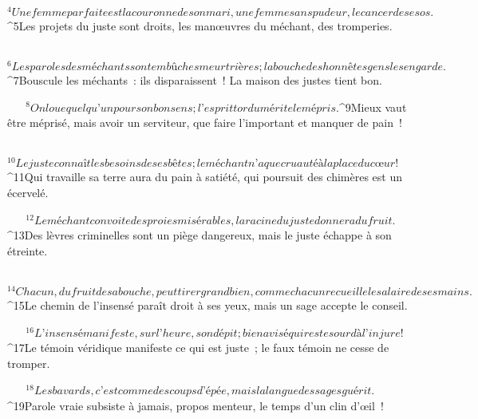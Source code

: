            
         
${}^{4}Une femme parfaite est la couronne de son mari,
        une femme sans pudeur, le cancer de ses os.
        
           
         
${}^{5}Les projets du juste sont droits,
        les manœuvres du méchant, des tromperies.
        
           
         
${}^{6}Les paroles des méchants sont embûches meurtrières ;
        la bouche des honnêtes gens les en garde.
        
           
         
${}^{7}Bouscule les méchants : ils disparaissent !
        La maison des justes tient bon.
        
           
         
${}^{8}On loue quelqu’un pour son bon sens ;
        l’esprit tordu mérite le mépris.
        
           
         
${}^{9}Mieux vaut être méprisé, mais avoir un serviteur,
        que faire l’important et manquer de pain !
        
           
         
${}^{10}Le juste connaît les besoins de ses bêtes ;
        le méchant n’a que cruauté à la place du cœur !
        
           
         
${}^{11}Qui travaille sa terre aura du pain à satiété,
        qui poursuit des chimères est un écervelé.
        
           
         
${}^{12}Le méchant convoite des proies misérables,
        la racine du juste donnera du fruit.
        
           
         
${}^{13}Des lèvres criminelles sont un piège dangereux,
        mais le juste échappe à son étreinte.
        
           
         
${}^{14}Chacun, du fruit de sa bouche, peut tirer grand bien,
        comme chacun recueille le salaire de ses mains.
        
           
         
${}^{15}Le chemin de l’insensé paraît droit à ses yeux,
        mais un sage accepte le conseil.
        
           
         
${}^{16}L’insensé manifeste, sur l’heure, son dépit ;
        bien avisé qui reste sourd à l’injure !
        
           
         
${}^{17}Le témoin véridique manifeste ce qui est juste ;
        le faux témoin ne cesse de tromper.
        
           
         
${}^{18}Les bavards, c’est comme des coups d’épée,
        mais la langue des sages guérit.
        
           
         
${}^{19}Parole vraie subsiste à jamais,
        propos menteur, le temps d’un clin d’œil !
        
